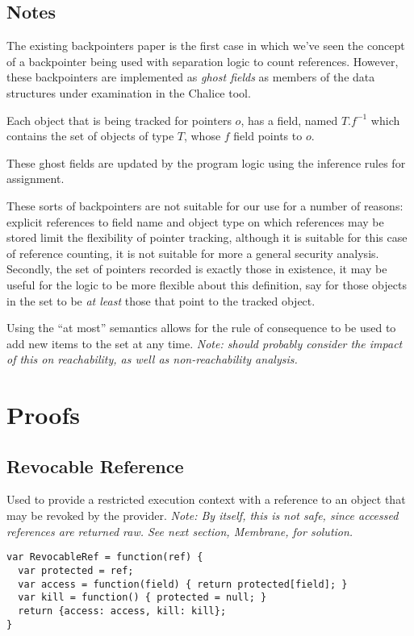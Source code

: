 \documentclass[a4paper]{article}
\begin{document}
\subsection{Notes}
The existing backpointers paper\cite{KassiosKritikos12} is the first case in
which we've seen the concept of a backpointer being used with separation logic
to count references. However, these backpointers are implemented as \emph{ghost
fields} as members of the data structures under examination in the Chalice
tool.

Each object that is being tracked for pointers $o$, has a field, named $T.f^{-1}$
which contains the set of objects of type $T$, whose $f$ field
points to $o$.

These ghost fields are updated by the program logic using the inference rules
for assignment.

These sorts of backpointers are not suitable for our use for a number of
reasons: explicit references to field name and object type on
which references may be stored limit the flexibility of pointer tracking,
although it is suitable for this case of reference counting, it is not suitable
for more a general security analysis. Secondly, the set of pointers recorded is
exactly those in existence, it may be useful for the logic to be more flexible
about this definition, say for those objects in the set to be \emph{at least}
those that point to the tracked object.

Using the ``at most'' semantics allows for the rule of consequence to be used to
add new items to the set at any time. \emph{Note: should probably consider the
impact of this on reachability, as well as non-reachability analysis.}

\section{Proofs}
\subsection{Revocable Reference}
Used to provide a restricted execution context with a reference to an object
that may be revoked by the provider.
\emph{Note: By itself, this is not safe, since accessed references are returned
  raw. See next section, Membrane, for solution.}

\begin{verbatim}
var RevocableRef = function(ref) {
  var protected = ref;
  var access = function(field) { return protected[field]; }
  var kill = function() { protected = null; }
  return {access: access, kill: kill};
}
\end{verbatim}
\end{document}
